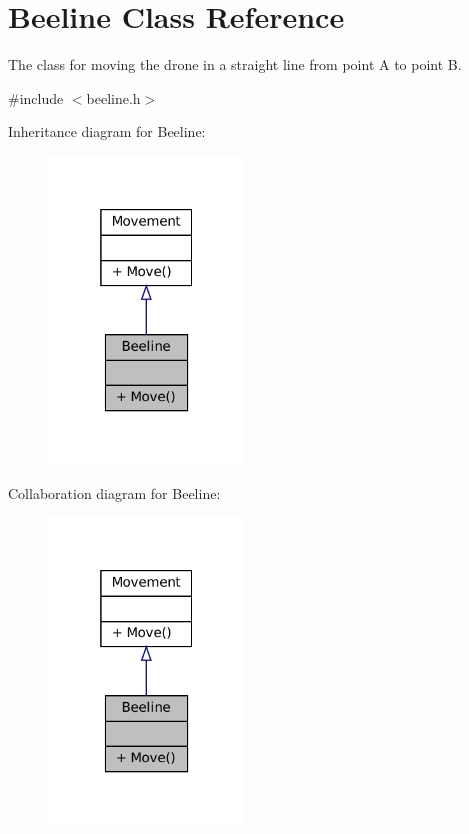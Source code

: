 \hypertarget{classBeeline}{}\section{Beeline Class Reference}
\label{classBeeline}


The class for moving the drone in a straight line from point A to point B.  




{\ttfamily \#include $<$beeline.\+h$>$}



Inheritance diagram for Beeline\+:\nopagebreak
\begin{figure}[H]
\begin{center}
\leavevmode
\includegraphics[width=148pt]{classBeeline__inherit__graph}
\end{center}
\end{figure}


Collaboration diagram for Beeline\+:\nopagebreak
\begin{figure}[H]
\begin{center}
\leavevmode
\includegraphics[width=148pt]{classBeeline__coll__graph}
\end{center}
\end{figure}
